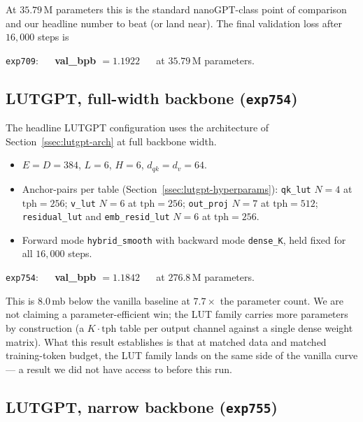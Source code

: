 \documentclass[11pt]{article}
\newcommand{\dqk}{d_{qk}}
\newcommand{\dv}{d_v}
\begin{document}
At $35.79$\,M parameters this is the standard nanoGPT-class point of comparison and our headline number to beat (or land near). The final validation loss after $16{,}000$ steps is

\begin{center}
\texttt{exp709}: $\quad$ \textbf{val\_bpb $= 1.1922$} $\quad$ at $35.79$\,M parameters.
\end{center}

\subsection{LUTGPT, full-width backbone (\texttt{exp754})}
\label{ssec:exp-headline}

The headline LUTGPT configuration uses the architecture of Section~\ref{ssec:lutgpt-arch} at full backbone width.

\begin{itemize}[leftmargin=*,topsep=2pt,itemsep=1pt]
\item $E = D = 384$, $L = 6$, $H = 6$, $\dqk = \dv = 64$.
\item Anchor-pairs per table (Section~\ref{ssec:lutgpt-hyperparams}): \texttt{qk\_lut} $N{=}4$ at $\mathrm{tph}{=}256$; \texttt{v\_lut} $N{=}6$ at $\mathrm{tph}{=}256$; \texttt{out\_proj} $N{=}7$ at $\mathrm{tph}{=}512$; \texttt{residual\_lut} and \texttt{emb\_resid\_lut} $N{=}6$ at $\mathrm{tph}{=}256$.
\item Forward mode \texttt{hybrid\_smooth} with backward mode \texttt{dense\_K}, held fixed for all $16{,}000$ steps.
\end{itemize}

\begin{center}
\texttt{exp754}: $\quad$ \textbf{val\_bpb $= 1.1842$} $\quad$ at $276.8$\,M parameters.
\end{center}

This is $8.0$\,mb below the vanilla baseline at $7.7\times$ the parameter count. We are not claiming a parameter-efficient win; the LUT family carries more parameters by construction (a $K \cdot \mathrm{tph}$ table per output channel against a single dense weight matrix). What this result establishes is that at matched data and matched training-token budget, the LUT family lands on the same side of the vanilla curve --- a result we did not have access to before this run.

\subsection{LUTGPT, narrow backbone (\texttt{exp755})}
\label{ssec:exp-narrow}
\end{document}
